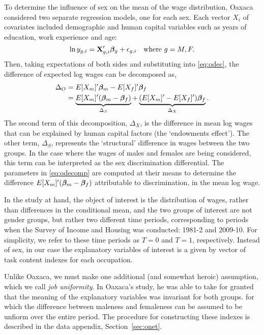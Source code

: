 To determine the influence of sex on the mean of the wage distribution, Oaxaca considered two separate regression models, one for each sex. Each vector $X_i$ of covariates included demographic and human capital variables such as years of education, work experience and age:
$$  \ln y_{g,i} = \mathbf{X}_{g,i}'\boldsymbol{\beta}_g + \epsilon_{g,i} \quad \text{where}\ g=M,F. $$
Then, taking expectations of both sides and substituting into \eqref{eq:odec}, the difference of expected log wages can be decomposed as,
\begin{align}
  \Delta_O &= E[X_m]'\boldsymbol{\beta}_m -  E[X_f]'\boldsymbol{\beta}_f \notag \\
  &= \underbrace{E[X_m]'(\boldsymbol{\beta}_m - \boldsymbol{\beta}_f)}_{\Delta_S} + \underbrace{(E[X_m]'-E[X_f]')\boldsymbol{\beta}_f}_{\Delta_X}. \label{eq:odecomp}
\end{align}
The second term of this decomposition, $\Delta_X$, is the difference in mean log wages that can be explained by human capital factors (the `endowments effect'). The other term, $\Delta_S$, represents the `structural' difference in wages between the two groups. In the case where the wages of males and females are being considered, this term can be interpreted as the sex discrimination differential. The parameters in \eqref{eq:odecomp} are computed at their means to determine the difference $E[X_m]'(\boldsymbol{\beta}_m - \boldsymbol{\beta}_f)$ attributable to discrimination, in the mean log wage.

In the study at hand, the object of interest is the distribution of wages, rather than differences in the conditional mean, and the two groups of interest are not gender groups, but rather two different time periods, corresponding to periods when the Survey of Income and Housing was conducted: 1981-2 and 2009-10. For simplicity, we refer to these time periods as $T=0$ and $T=1$, respectively. Instead of sex, in our case the explanatory variables of interest is a given by vector of task content indexes for each occupation.  

Unlike Oaxaca, we must make one additional (and somewhat heroic) assumption, which we call {\em job uniformity}. In Oaxaca's study, he was able to take for granted that the meaning of the explanatory variables was invariant for both groups. for which the difference between maleness and femaleness can be assumed to be unfiorm over the entire period. The procedure for constructing these indexes is described in the data appendix, Section~\ref{sec:onet}.

